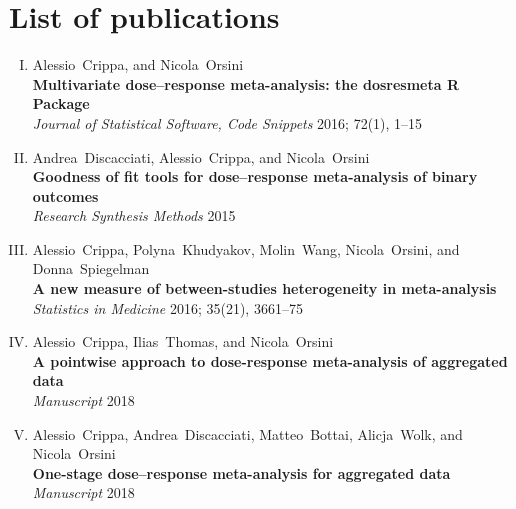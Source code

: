 \documentclass[11pt,a4paper,twoside,openany]{book}\usepackage{knitr}
\begin{document}
{\chapter*{List of publications}

\begin{enumerate}[I.]
\item Alessio~Crippa, and Nicola~Orsini \\ \textbf{Multivariate dose--response meta-analysis: the dosresmeta R Package} \\ \textit{Journal of Statistical Software, Code Snippets} 2016; 72(1), 1--15
\item Andrea~Discacciati, Alessio~Crippa, and Nicola~Orsini \\ \textbf{Goodness of fit tools for dose--response meta-analysis of binary outcomes} \\ \textit{Research Synthesis Methods} 2015
\item Alessio~Crippa, Polyna~Khudyakov, Molin~Wang, Nicola~Orsini, and Donna~Spiegelman \\ \textbf{A new measure of between-studies heterogeneity in meta-analysis} \\ \textit{Statistics in Medicine} 2016; 35(21), 3661--75
\item Alessio~Crippa, Ilias~Thomas, and Nicola~Orsini \\ \textbf{A pointwise approach to dose-response meta-analysis of aggregated data} \\ \textit{Manuscript} 2018
\item Alessio~Crippa, Andrea~Discacciati, Matteo~Bottai, Alicja~Wolk, and Nicola~Orsini \\ \textbf{One-stage dose--response meta-analysis for aggregated data} \\ \textit{Manuscript} 2018
\end{enumerate}
\vspace{1.5cm}

}
\end{document}
